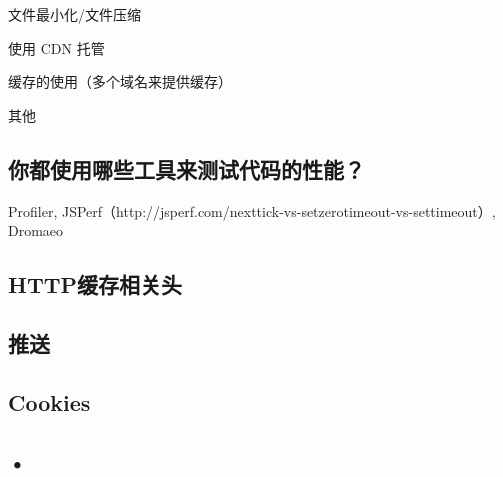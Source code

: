  文件最小化/文件压缩
 
 使用 CDN 托管
 
 缓存的使用（多个域名来提供缓存）
 
 其他
 
 
 \subsection{你都使用哪些工具来测试代码的性能？}

Profiler, JSPerf（http://jsperf.com/nexttick-vs-setzerotimeout-vs-settimeout）, Dromaeo



\subsection{HTTP缓存相关头}


\subsection{推送}

\subsection{Cookies}

\subsection{•}